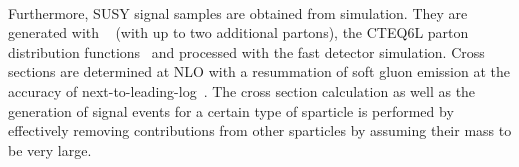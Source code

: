 \\
Furthermore, SUSY signal samples are obtained from simulation. They are generated with \madgraph~\cite{Alwall:2007st} (with up to two additional partons), the CTEQ6L parton distribution functions~\cite{Pumplin:2002vw} and processed with the fast detector simulation. Cross sections are determined at NLO with a resummation of soft gluon emission at the accuracy of next-to-leading-log~\cite{Beenakker:1996ch, PhysRevLett.102.111802, PhysRevD.80.095004, Beenakker:2009ha, Beenakker:2011fu, Kramer:2012bx}. The cross section calculation as well as the generation of signal events for a certain type of sparticle is performed by effectively removing contributions from other sparticles by assuming their mass to be very large.

